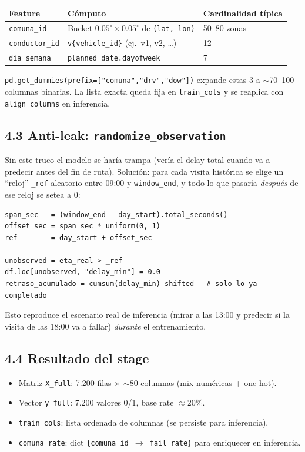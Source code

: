 \documentclass[11pt,a4paper]{article}
\begin{document}
\begin{tabular}{p{3.4cm} p{6cm} p{5cm}}
\toprule
\textbf{Feature} & \textbf{Cómputo} & \textbf{Cardinalidad típica} \\
\midrule
\texttt{comuna\_id} & Bucket $0.05^{\circ} \times 0.05^{\circ}$ de \texttt{(lat, lon)} & 50--80 zonas \\
\texttt{conductor\_id} & \texttt{v\{vehicle\_id\}} (ej.\ v1, v2, \dots) & 12 \\
\texttt{dia\_semana} & \texttt{planned\_date.dayofweek} & 7 \\
\bottomrule
\end{tabular}

\noindent
\texttt{pd.get\_dummies(prefix=["comuna","drv","dow"])} expande estas 3 a $\sim$70--100 columnas binarias. La lista exacta queda fija en \texttt{train\_cols} y se reaplica con \texttt{align\_columns} en inferencia.

\subsection{4.3 Anti-leak: \texttt{randomize\_observation}}

Sin este truco el modelo se haría trampa (vería el delay total cuando va a predecir antes del fin de ruta). Solución: para cada visita histórica se elige un ``reloj'' \texttt{\_ref} aleatorio entre 09:00 y \texttt{window\_end}, y todo lo que pasaría \emph{después} de ese reloj se setea a 0:

\begin{lstlisting}[language=pyplus]
span_sec   = (window_end - day_start).total_seconds()
offset_sec = span_sec * uniform(0, 1)
ref        = day_start + offset_sec

unobserved = eta_real > _ref
df.loc[unobserved, "delay_min"] = 0.0
retraso_acumulado = cumsum(delay_min) shifted   # solo lo ya completado
\end{lstlisting}

Esto reproduce el escenario real de inferencia (mirar a las 13:00 y predecir si la visita de las 18:00 va a fallar) \emph{durante} el entrenamiento.

\subsection{4.4 Resultado del stage}

\begin{itemize}
  \item Matriz \texttt{X\_full}: 7.200 filas $\times$ $\sim$80 columnas (mix numéricas + one-hot).
  \item Vector \texttt{y\_full}: 7.200 valores 0/1, base rate $\approx 20\%$.
  \item \texttt{train\_cols}: lista ordenada de columnas (se persiste para inferencia).
  \item \texttt{comuna\_rate}: dict \texttt{\{comuna\_id $\rightarrow$ fail\_rate\}} para enriquecer en inferencia.
\end{itemize}
\end{document}

